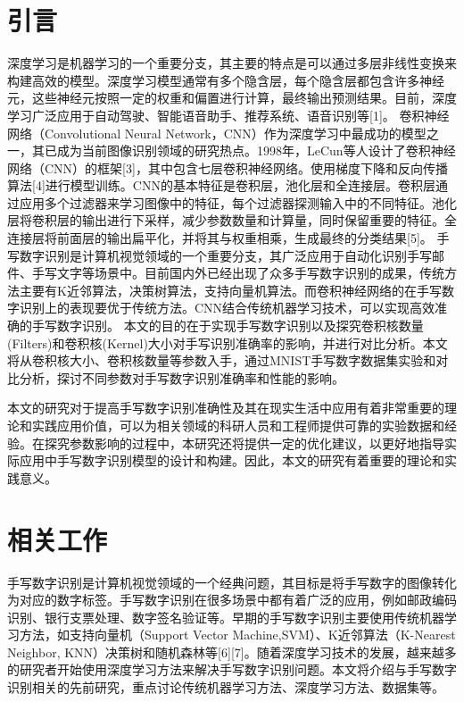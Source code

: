 \documentclass[11pt]{article}
\begin{document}
\section{引言}
\label{sec:org3dd395e}
深度学习是机器学习的一个重要分支，其主要的特点是可以通过多层非线性变换来构建高效的模型。深度学习模型通常有多个隐含层，每个隐含层都包含许多神经元，这些神经元按照一定的权重和偏置进行计算，最终输出预测结果。目前，深度学习广泛应用于自动驾驶、智能语音助手、推荐系统、语音识别等[1]。
卷积神经网络（Convolutional Neural Network，CNN）作为深度学习中最成功的模型之一，其已成为当前图像识别领域的研究热点。1998年，LeCun等人设计了卷积神经网络（CNN）的框架[3]，其中包含七层卷积神经网络。使用梯度下降和反向传播算法[4]进行模型训练。CNN的基本特征是卷积层，池化层和全连接层。卷积层通过应用多个过滤器来学习图像中的特征，每个过滤器探测输入中的不同特征。池化层将卷积层的输出进行下采样，减少参数数量和计算量，同时保留重要的特征。全连接层将前面层的输出扁平化，并将其与权重相乘，生成最终的分类结果[5]。
手写数字识别是计算机视觉领域的一个重要分支，其广泛应用于自动化识别手写邮件、手写文字等场景中。目前国内外已经出现了众多手写数字识别的成果，传统方法主要有K近邻算法，决策树算法，支持向量机算法。而卷积神经网络的在手写数字识别上的表现要优于传统方法。CNN结合传统机器学习技术，可以实现高效准确的手写数字识别。
本文的目的在于实现手写数字识别以及探究卷积核数量(Filters)和卷积核(Kernel)大小对手写识别准确率的影响，并进行对比分析。本文将从卷积核大小、卷积核数量等参数入手，通过MNIST手写数字数据集实验和对比分析，探讨不同参数对手写数字识别准确率和性能的影响。

本文的研究对于提高手写数字识别准确性及其在现实生活中应用有着非常重要的理论和实践应用价值，可以为相关领域的科研人员和工程师提供可靠的实验数据和经验。在探究参数影响的过程中，本研究还将提供一定的优化建议，以更好地指导实际应用中手写数字识别模型的设计和构建。因此，本文的研究有着重要的理论和实践意义。
\section{相关工作}
\label{sec:org622c298}
手写数字识别是计算机视觉领域的一个经典问题，其目标是将手写数字的图像转化为对应的数字标签。手写数字识别在很多场景中都有着广泛的应用，例如邮政编码识别、银行支票处理、数字签名验证等。早期的手写数字识别主要使用传统机器学习方法，如支持向量机（Support Vector Machine,SVM）、K近邻算法（K-Nearest Neighbor, KNN）决策树和随机森林等[6][7]。随着深度学习技术的发展，越来越多的研究者开始使用深度学习方法来解决手写数字识别问题。本文将介绍与手写数字识别相关的先前研究，重点讨论传统机器学习方法、深度学习方法、数据集等。
\end{document}
